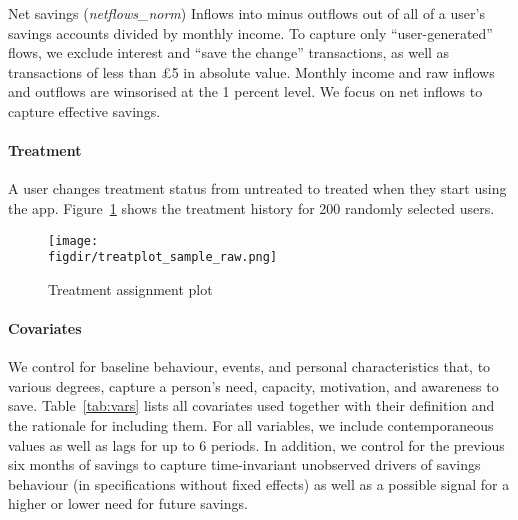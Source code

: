 Net savings (\textit{netflows\_norm})
Inflows into minus outflows out of all of a user's savings accounts divided
by monthly income. To capture only ``user-generated'' flows, we exclude
interest and ``save the change'' transactions, as well as transactions of
less than \pounds5 in absolute
value. Monthly income and raw inflows and outflows are winsorised at the 1
percent level.
We focus on net inflows to capture effective savings.


\paragraph{Treatment}%
\label{par:treatment}

A user changes treatment status from untreated to treated when they start using
the app. Figure~\ref{fig:treatplot_sample_raw} shows the treatment history for
200 randomly selected users.

\begin{figure}[H]
    \centering
    \caption{Treatment assignment plot}%
    \texttt{[image: \\figdir/treatplot\_sample\_raw.png]}
    \label{fig:treatplot_sample_raw}


\end{figure}



\paragraph{Covariates}%
\label{par:covariates}

We control for baseline behaviour, events, and personal characteristics that,
to various degrees, capture a person's need, capacity, motivation, and
awareness to save. Table~\ref{tab:vars} lists all covariates used
together with their definition and the rationale for including them. For all
variables, we include contemporaneous values as well as lags for up to 6
periods. In addition, we control for the previous six months of savings to
capture time-invariant unobserved drivers of savings behaviour (in
specifications without fixed effects) as well as a possible signal for a higher
or lower need for future savings.

